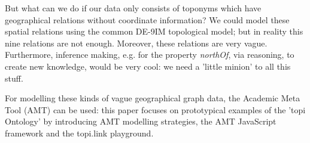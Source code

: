 \documentclass[a4paper]{article}
\begin{document}
But what can we do if our data only consists of toponyms which have geographical relations without coordinate information? We could model these spatial relations\cite{clementini_modelling_1994} using the common DE-9IM\cite{mark_modeling_1994} topological model; but in reality this nine relations are not enough. Moreover, these relations are very vague. Furthermore, inference making, e.g. for the property \textit{northOf}\cite{thiery_zenodo_1}, via reasoning\cite{thiery_zenodo_4}, to create new knowledge, would be very cool: we need a 'little minion' to all this stuff.

For modelling these kinds of vague geographical graph data, the Academic Meta Tool\cite{unold_academic_2019} (AMT) can be used: this paper focuses on prototypical examples of the 'topi Ontology'\cite{thiery_zenodo_2} by introducing AMT modelling strategies, the AMT JavaScript framework\cite{thiery_zenodo_3} and the topi.link playground\cite{thiery_topilink_2019}.



\end{document}
